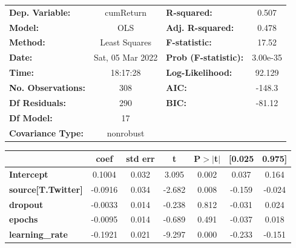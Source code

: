 \begin{center}
\begin{tabular}{lclc}
\toprule
\textbf{Dep. Variable:}                   &    cumReturn     & \textbf{  R-squared:         } &     0.507   \\
\textbf{Model:}                           &       OLS        & \textbf{  Adj. R-squared:    } &     0.478   \\
\textbf{Method:}                          &  Least Squares   & \textbf{  F-statistic:       } &     17.52   \\
\textbf{Date:}                            & Sat, 05 Mar 2022 & \textbf{  Prob (F-statistic):} &  3.00e-35   \\
\textbf{Time:}                            &     18:17:28     & \textbf{  Log-Likelihood:    } &    92.129   \\
\textbf{No. Observations:}                &         308      & \textbf{  AIC:               } &    -148.3   \\
\textbf{Df Residuals:}                    &         290      & \textbf{  BIC:               } &    -81.12   \\
\textbf{Df Model:}                        &          17      & \textbf{                     } &             \\
\textbf{Covariance Type:}                 &    nonrobust     & \textbf{                     } &             \\
\bottomrule
\end{tabular}
\begin{tabular}{lcccccc}
                                          & \textbf{coef} & \textbf{std err} & \textbf{t} & \textbf{P$> |$t$|$} & \textbf{[0.025} & \textbf{0.975]}  \\
\midrule
\textbf{Intercept}                        &       0.1004  &        0.032     &     3.095  &         0.002        &        0.037    &        0.164     \\
\textbf{source[T.Twitter]}                &      -0.0916  &        0.034     &    -2.682  &         0.008        &       -0.159    &       -0.024     \\
\textbf{dropout}                          &      -0.0033  &        0.014     &    -0.238  &         0.812        &       -0.031    &        0.024     \\
\textbf{epochs}                           &      -0.0095  &        0.014     &    -0.689  &         0.491        &       -0.037    &        0.018     \\
\textbf{learning\_rate}                   &      -0.1921  &        0.021     &    -9.297  &         0.000        &       -0.233    &       -0.151     \\

\end{tabular}
\end{center}
